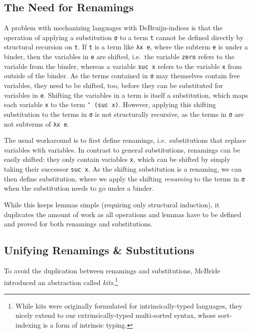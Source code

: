 \documentclass[sigplan,10pt]{acmart}
\begin{document}
  \subsection{The Need for Renamings}
  A problem with mechanizing languages with DeBruijn-indices is that
  the operation of applying a substitution \texttt{σ} to a term
  \texttt{t} cannot be defined directly by structural recursion on
  \texttt{t}.
  If \texttt{t} is a term like \texttt{λx e},
  where the subterm \texttt{e} is under a binder, then the variables
  in \texttt{e} are shifted, i.e.\ the variable \texttt{zero} refers
  to the variable from the binder, whereas a variable \texttt{suc x}
  refers to the variable \texttt{x} from outside of the binder.
  As the terms contained in \texttt{σ} may themselves contain free variables,
  they need to be shifted, too, before they can be substituted
  for variables in \texttt{e}. 
  Shifting the variables in a term is itself a substitution, which maps
  each variable \texttt{x} to the term \texttt{` (suc x)}.
  However, applying this shifting substitution to the terms in
  \texttt{σ} is not structurally recursive, as the terms in \texttt{σ}
  are not subterms of \texttt{λx e}.

  The usual workaround is to first define renamings,
  i.e.\ substitutions that replace variables with variables.
  In contrast to general substitutions, renamings can be easily
  shifted: they only contain variables \texttt{x}, which can be
  shifted by simply taking their successor \texttt{suc x}.
  As the shifting substitution is a renaming, we can then define substitution,
  where we apply the shifting \emph{renaming} to the terms in \texttt{σ} when
  the substitution needs to go under a binder.

  While this keeps lemmas simple (requiring only structural induction),
  it duplicates the amount of work as all operations and lemmas have
  to be defined and proved for both renamings and substitutions.

  \subsection{Unifying Renamings \& Substitutions}
  To avoid the duplication between renamings and substitutions,
  McBride\cite{DBLP:journals/jar/BentonHKM12, unpublished:mcbride2005kits}
  introduced an abstraction called \emph{kits}.\footnote{
    While kits were originally formulated for intrinsically-typed languages,
    they nicely extend to our extrinsically-typed multi-sorted syntax, whose
    sort-indexing is a form of intrinsic typing.
  }
\end{document}
